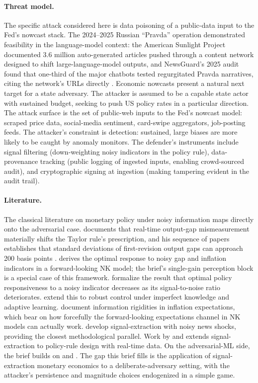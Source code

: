 \documentclass[12pt]{article}
\begin{document}
\paragraph{Threat model.}
The specific attack considered here is data poisoning of a public-data input to the Fed's nowcast stack. The 2024--2025 Russian ``Pravda'' operation demonstrated feasibility in the language-model context: the American Sunlight Project documented 3.6 million auto-generated articles pushed through a content network designed to shift large-language-model outputs, and NewsGuard's 2025 audit found that one-third of the major chatbots tested regurgitated Pravda narratives, citing the network's URLs directly \citep{asp2025, newsguard2025}. Economic nowcasts present a natural next target for a state adversary. The attacker is assumed to be a capable state actor with sustained budget, seeking to push US policy rates in a particular direction. The attack surface is the set of public-web inputs to the Fed's nowcast model: scraped price data, social-media sentiment, card-swipe aggregators, job-posting feeds. The attacker's constraint is detection: sustained, large biases are more likely to be caught by anomaly monitors. The defender's instruments include signal filtering (down-weighting noisy indicators in the policy rule), data-provenance tracking (public logging of ingested inputs, enabling crowd-sourced audit), and cryptographic signing at ingestion (making tampering evident in the audit trail).

\paragraph{Literature.}
The classical literature on monetary policy under noisy information maps directly onto the adversarial case. \citet{orphanides2001} documents that real-time output-gap mismeasurement materially shifts the Taylor rule's prescription, and his sequence of papers establishes that standard deviations of first-revision output gaps can approach 200 basis points \citep{orphanides2001, orphanides2003monetary, orphanides2003historical}. \citet{aoki2003} derives the optimal response to noisy gap and inflation indicators in a forward-looking NK model; the brief's single-gain perception block is a special case of this framework. \citet{svensson2003} formalize the result that optimal policy responsiveness to a noisy indicator decreases as its signal-to-noise ratio deteriorates. \citet{orphanides2007robust} extend this to robust control under imperfect knowledge and adaptive learning. \citet{coibion2012} document information rigidities in inflation expectations, which bear on how forcefully the forward-looking expectations channel in NK models can actually work. \citet{blanchard2013news} develop signal-extraction with noisy news shocks, providing the closest methodological parallel. Work by \citet{nimark2008} and \citet{boivin2006} extends signal-extraction to policy-rule design with real-time data. On the adversarial-ML side, the brief builds on \citet{biggio2018wild} and \citet{steinhardt2017}. The gap this brief fills is the application of signal-extraction monetary economics to a deliberate-adversary setting, with the attacker's persistence and magnitude choices endogenized in a simple game.
\end{document}
